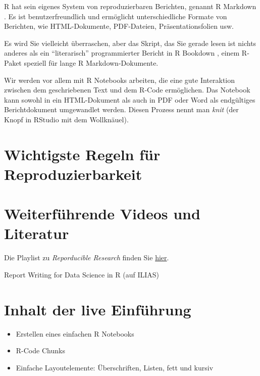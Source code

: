 \documentclass[]{book}
\providecommand{\tightlist}{%
  \setlength{\itemsep}{0pt}\setlength{\parskip}{0pt}}
\begin{document}
R hat sein eigenes System von reproduzierbaren Berichten, genannt R Markdown \citep{Xie2018}. Es ist benutzerfreundlich und ermöglicht unterschiedliche Formate von Berichten, wie HTML-Dokumente, PDF-Dateien, Präsentationsfolien usw.

Es wird Sie vielleicht überraschen, aber das Skript, das Sie gerade lesen ist nichts anderes als ein ``literarisch'' programmierter Bericht in R Bookdown \citep{Xie2016}, einem R-Paket speziell für lange R Markdown-Dokumente.

Wir werden vor allem mit R Notebooks arbeiten, die eine gute Interaktion zwischen dem geschriebenen Text und dem R-Code ermöglichen. Das Notebook kann sowohl in ein HTML-Dokument als auch in PDF oder Word als endgültiges Berichtdokument umgewandlet werden. Diesen Prozess nennt man \emph{knit} (der Knopf in RStudio mit dem Wollknäuel).

\hypertarget{wichtigste-regeln-fuxfcr-reproduzierbarkeit}{%
\section{Wichtigste Regeln für Reproduzierbarkeit}\label{wichtigste-regeln-fuxfcr-reproduzierbarkeit}}

\hypertarget{weiterfuxfchrende-videos-und-literatur}{%
\section{Weiterführende Videos und Literatur}\label{weiterfuxfchrende-videos-und-literatur}}

Die Playlist zu \emph{Reporducible Research} finden Sie \href{https://www.youtube.com/watch?v=4rBX6r5emgQ\&list=PLjTlxb-wKvXOU4WW4p3qc4VKWTI4gLNUf}{hier}.

Report Writing for Data Science in R \citep{Peng2019} (auf ILIAS)

\hypertarget{inhalt-der-live-einfuxfchrung-3}{%
\section{Inhalt der live Einführung}\label{inhalt-der-live-einfuxfchrung-3}}

\begin{itemize}
\tightlist
\item
  Erstellen eines einfachen R Notebooks
\item
  R-Code Chunks
\item
  Einfache Layoutelemente: Überschriften, Listen, fett und kursiv
\end{itemize}
\end{document}
